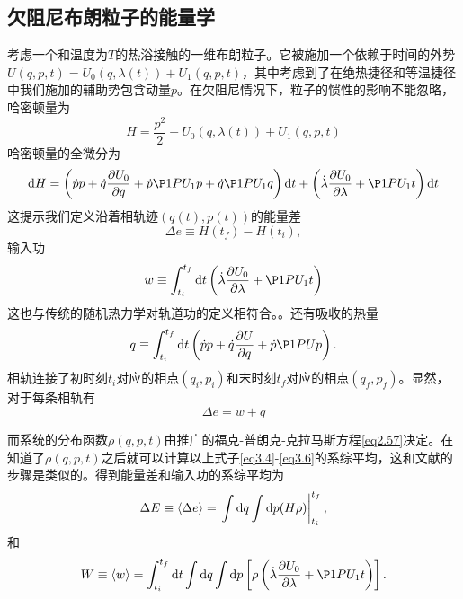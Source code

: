 \subsection{欠阻尼布朗粒子的能量学}
\qquad 考虑一个和温度为$T$的热浴接触的一维布朗粒子。它被施加一个依赖于时间的外势$U(q,p,t) = U_0 (q,\lambda(t)) + U_1 (q,p,t)$，其中考虑到了在绝热捷径和等温捷径中我们施加的辅助势包含动量$p$。在欠阻尼情况下，粒子的惯性的影响不能忽略，哈密顿量为
\begin{equation}
    H=\frac{p^{2}}{2}+U_0 (q,\lambda(t)) + U_1 (q,p,t)
    \label{eq3.1}
\end{equation}
哈密顿量的全微分为
\begin{equation}
    \M{d} H=\left(\dot{p} p+\dot{q} \frac{\partial U_0}{\partial q} +  \dot{p} \P1P{U_1}{p} + \dot{q} \P1P{U_1}{q}  \right) \M{d} t+\left(\dot{\lambda} \frac{\partial U_0}{\partial \lambda} + \P1P{U_1}{t} \right) \M{d} t
    \label{eq3.2}
\end{equation}
这提示我们定义沿着相轨迹$(q(t), p(t))$的能量差\cite{Tu2013}
\begin{equation}
     \Delta e \equiv H\left(t_{f}\right)-H\left(t_{i}\right),
     \label{eq3.3}
\end{equation}
输入功
\begin{equation}
    w \equiv \int_{t_{i}}^{t_{f}} \M{d} t \left( \dot{\lambda} \frac{\partial U_0}{\partial \lambda} + \P1P{U_1}{t} \right)
    \label{eq3.4}
\end{equation}
这也与传统的随机热力学对轨道功的定义相符合。\cite{Sekimoto2010,Jarzynski1997,Sekimoto_1997}。还有吸收的热量
\begin{equation}
    q \equiv \int_{t_{i}}^{t_{f}} \M{d} t \left(\dot{p} p+\dot{q} \frac{\partial U}{\partial q} +  \dot{p} \P1P{U}{p}\right).
    \label{eq3.5}
\end{equation}
相轨连接了初时刻$t_i$对应的相点$(q_i , p_i )$和末时刻$t_f$对应的相点$(q_f , p_f )$。显然，对于每条相轨有
\begin{equation}
    \Delta e = w + q
    \label{eq3.6}
\end{equation}

而系统的分布函数$\rho (q,p,t)$由推广的福克-普朗克-克拉马斯方程\eqref{eq2.57}决定。在知道了$\rho (q,p,t)$之后就可以计算以上式子\eqref{eq3.4}-\eqref{eq3.6}的系综平均，这和文献\cite{Seifert2005,Shizume1995,Bizarro2011}的步骤是类似的。得到能量差和输入功的系综平均为
\begin{equation}
    \Delta E \equiv \langle\Delta e\rangle=\left.\int \mathrm{d} q \int \mathrm{d} p(H \rho)\right|_{t_{i}} ^{t_{f}} ,
    \label{eq3.7}
\end{equation}
和
\begin{equation}
    W \equiv\langle w\rangle=\int_{t_{i}}^{t_{f}} \M{d} t \int \M{d} q \int \M{d} p \left[ \rho\left( \dot{\lambda} \frac{\partial U_0}{\partial \lambda} + \P1P{U_1}{t} \right)\right] .
    \label{eq3.8}
\end{equation}

